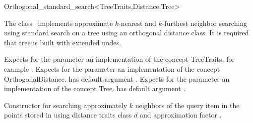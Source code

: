 

\begin{ccRefClass}{Orthogonal_standard_search<TreeTraits,Distance,Tree>}  %


\ccDefinition

The class \ccRefName\ implements approximate $k$-nearest and $k$-furthest neighbor searching
using standard search on a  tree using an orthogonal distance
class. It is required that tree is built with extended nodes.


\ccParameters

Expects for the parameter  an implementation of the concept TreeTraits,
for example .
Expects for the parameter  an implementation of the
concept OrthogonalDistance.  has default argument 
.
Expects for the parameter  an implementation of the concept Tree.
 has default argument .




\ccTypes



\ccOperations

{Constructor for searching approximately $k$ neighbors of the query item  
in the points stored in  using 
distance
traits class $d$ and approximation factor .}


\end{ccRefClass}
